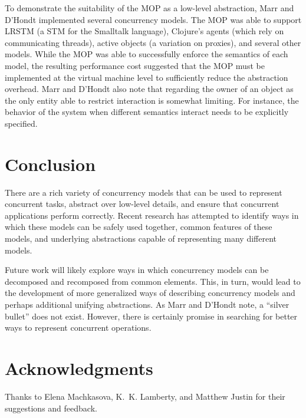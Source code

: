 \documentclass{sig-alternate}
\begin{document}
To demonstrate the suitability of the MOP as a low-level abstraction, Marr and D'Hondt implemented several concurrency models. The MOP was able to support LRSTM (a STM for the Smalltalk language), Clojure's agents (which rely on communicating threads), active objects (a variation on proxies), and several other models. While the MOP was able to successfully enforce the semantics of each model, the resulting performance cost suggested that the MOP must be implemented at the virtual machine level to sufficiently reduce the abstraction overhead. Marr and D'Hondt also note that regarding the owner of an object as the only entity able to restrict interaction is somewhat limiting. For instance, the behavior of the system when different semantics interact needs to be explicitly specified.

\section{Conclusion}

There are a rich variety of concurrency models that can be used to represent concurrent tasks, abstract over low-level details, and ensure that concurrent applications perform correctly. Recent research has attempted to identify ways in which these models can be safely used together, common features of these models, and underlying abstractions capable of representing many different models.

Future work will likely explore ways in which concurrency models can be decomposed and recomposed from common elements. This, in turn, would lead to the development of more generalized ways of describing concurrency models and perhaps additional unifying abstractions. As Marr and D'Hondt note, a ``silver bullet'' does not exist. However, there is certainly promise in searching for better ways to represent concurrent operations.

\section*{Acknowledgments}

Thanks to Elena Machkasova, K.~K. Lamberty, and Matthew Justin for their suggestions and feedback.

\printbibliography{}
\end{document}
